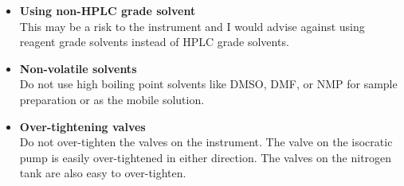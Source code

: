 \documentclass[12pt, letterpaper]{article}
\begin{document}
\begin{itemize}
	\item \textbf{Using non-HPLC grade solvent}\\
	This may be a risk to the instrument and I would advise against using reagent grade solvents instead of HPLC grade solvents.
	
	\item \textbf{Non-volatile solvents}\\
	Do not use high boiling point solvents like DMSO, DMF, or NMP for sample preparation or as the mobile solution.

	\item \textbf{Over-tightening valves}\\
	Do not over-tighten the valves on the instrument.
	The valve on the isocratic pump is easily over-tightened in either direction.
	The valves on the nitrogen tank are also easy to over-tighten.

\end{itemize}
\end{document}
